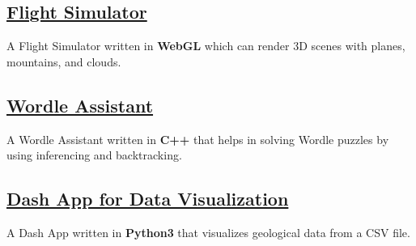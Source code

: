 \documentclass[]{resume}
\begin{document}
\begin{minipage}[t]{0.5\textwidth}
    \subsection{\href{https://github.com/Qazalbash/Flight-Simulator-in-WebGL}{\textbf{Flight Simulator}}}
    A Flight Simulator written in \textbf{WebGL} which can render 3D scenes with planes, mountains, and clouds.

    \subsection{\href{https://github.com/Qazalbash/Wordle-Assistant}{\textbf{Wordle Assistant}}}%
    A Wordle Assistant written in \textbf{C++} that helps in solving Wordle puzzles by using inferencing and backtracking.

    \subsection{\href{https://github.com/Qazalbash/Dash-App-for-Data-Visualization}{
            \textbf{Dash App for Data Visualization}}}%
    A Dash App written in \textbf{Python3} that visualizes geological data from a CSV file.


\end{minipage}
\end{document}
